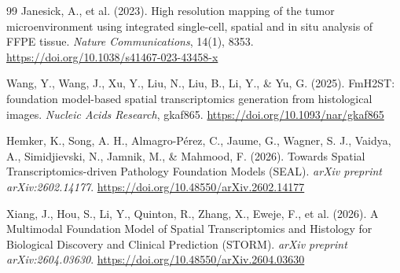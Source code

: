 \documentclass[11pt, a4paper]{article}
\begin{document}
\begin{thebibliography}{99}
 Janesick, A., et al. (2023). High resolution mapping of the tumor microenvironment using integrated single-cell, spatial and in situ analysis of FFPE tissue. \textit{Nature Communications}, 14(1), 8353. \href{https://doi.org/10.1038/s41467-023-43458-x}{https://doi.org/10.1038/s41467-023-43458-x}

 Wang, Y., Wang, J., Xu, Y., Liu, N., Liu, B., Li, Y., \& Yu, G. (2025). FmH2ST: foundation model-based spatial transcriptomics generation from histological images. \textit{Nucleic Acids Research}, gkaf865. \href{https://doi.org/10.1093/nar/gkaf865}{https://doi.org/10.1093/nar/gkaf865}

 Hemker, K., Song, A. H., Almagro-Pérez, C., Jaume, G., Wagner, S. J., Vaidya, A., Simidjievski, N., Jamnik, M., \& Mahmood, F. (2026). Towards Spatial Transcriptomics-driven Pathology Foundation Models (SEAL). \textit{arXiv preprint arXiv:2602.14177}. \href{https://doi.org/10.48550/arXiv.2602.14177}{https://doi.org/10.48550/arXiv.2602.14177}

 Xiang, J., Hou, S., Li, Y., Quinton, R., Zhang, X., Eweje, F., et al. (2026). A Multimodal Foundation Model of Spatial Transcriptomics and Histology for Biological Discovery and Clinical Prediction (STORM). \textit{arXiv preprint arXiv:2604.03630}. \href{https://doi.org/10.48550/arXiv.2604.03630}{https://doi.org/10.48550/arXiv.2604.03630}

\end{thebibliography}
\end{document}
